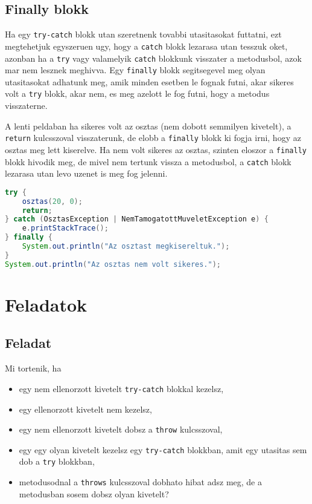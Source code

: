 \documentclass{article}
\let\l\lstinline
\begin{document}
\subsection{Finally blokk}

Ha egy \l{try-catch} blokk utan szeretnenk tovabbi utasitasokat futtatni, ezt megtehetjuk egyszeruen ugy, hogy a \l{catch} blokk lezarasa utan tesszuk oket, azonban ha a \l{try} vagy valamelyik \l{catch} blokkunk visszater a metodusbol, azok mar nem lesznek meghivva. Egy \l{finally} blokk segitsegevel meg olyan utasitasokat adhatunk meg, amik minden esetben le fognak futni, akar sikeres volt a \l{try} blokk, akar nem, es meg azelott le fog futni, hogy a metodus visszaterne.

A lenti peldaban ha sikeres volt az osztas (nem dobott semmilyen kivetelt), a \l{return} kulcsszoval visszaterunk, de elobb a \l{finally} blokk ki fogja irni, hogy az osztas meg lett kiserelve. Ha nem volt sikeres az osztas, szinten eloszor a \l{finally} blokk hivodik meg, de mivel nem tertunk vissza a metodusbol, a \l{catch} blokk lezarasa utan levo uzenet is meg fog jelenni.

\begin{lstlisting}[language=Java, caption=Finally block]
try {
    osztas(20, 0);
    return;
} catch (OsztasException | NemTamogatottMuveletException e) {
    e.printStackTrace();
} finally {
    System.out.println("Az osztast megkisereltuk.");
}
System.out.println("Az osztas nem volt sikeres.");
\end{lstlisting}
\newpage

\newpage
\section{Feladatok}

\subsection{Feladat}

Mi tortenik, ha
\begin{itemize}
    \item egy nem ellenorzott kivetelt \l{try-catch} blokkal kezelsz,
    \item egy ellenorzott kivetelt nem kezelsz,
    \item egy nem ellenorzott kivetelt dobsz a \l{throw} kulcsszoval,
    \item egy egy olyan kivetelt kezelsz egy \l{try-catch} blokkban, amit egy utasitas sem dob a \l{try} blokkban,
    \item metodusodnal a \l{throws} kulcsszoval dobhato hibat adsz meg, de a metodusban sosem dobsz olyan kivetelt?
\end{itemize}
\end{document}
